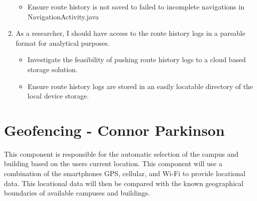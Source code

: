 \documentclass{scrreprt}
\begin{document}
\begin{enumerate}
		\begin{itemize}
			\item Ensure route history is not saved to failed to incomplete navigations in NavigationActivity.java
		\end{itemize}
	
	\item As a researcher, I should have access to the route history logs in a parsable format for analytical purposes.
	
		\begin{itemize}
			\item Investigate the feasibility of pushing route history logs to a cloud based storage solution.
			\item Ensure route history logs are stored in an easily locatable directory of the local device storage.
		\end{itemize}
	
\end{enumerate}

\pagebreak

\section{Geofencing - Connor Parkinson}
This component is responsible for the automatic selection of the campus and building based on the user\textsc{}s current location. This component will use a combination of the smartphones GPS, cellular, and Wi-Fi to provide locational data. This locational data will then be compared with the known geographical boundaries of available campuses and buildings.
\end{document}
